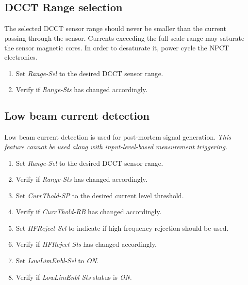 \documentclass[openany]{article}
\begin{document}
	\subsection{DCCT Range selection}

		\paragraph{} The selected DCCT sensor range should never be smaller than the current passing through the sensor. Currents exceeding the full scale range may saturate the sensor magnetic cores. In order to desaturate it, power cycle the NPCT electronics.

			\begin{enumerate}
				\item Set \emph{Range-Sel} to the desired DCCT sensor range.
				\item Verify if \emph{Range-Sts} has changed accordingly.
			\end{enumerate}

	\subsection{Low beam current detection}

		\paragraph{} Low beam current detection is used for post-mortem signal generation. \emph{This feature cannot be used along with input-level-based measurement triggering}.

			\begin{enumerate}
				\item Set \emph{Range-Sel} to the desired DCCT sensor range.
				\item Verify if \emph{Range-Sts} has changed accordingly.
				\item Set \emph{CurrThold-SP} to the desired current level threshold.
				\item Verify if \emph{CurrThold-RB} has changed accordingly.
				\item Set \emph{HFReject-Sel} to indicate if high frequency rejection should be used.
				\item Verify if \emph{HFReject-Sts} has changed accordingly.
				\item Set \emph{LowLimEnbl-Sel} to \emph{ON}.
				\item Verify if \emph{LowLimEnbl-Sts} status is \emph{ON}.
			\end{enumerate}
\end{document}
